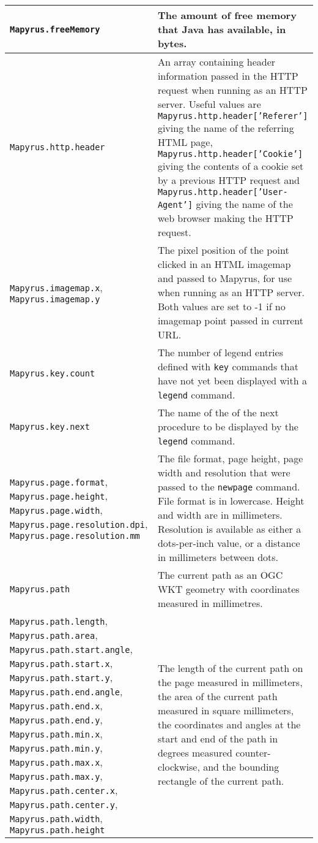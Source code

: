 \begin{longtable}{|p{6cm}|p{7cm}|}
\texttt{Mapyrus.freeMemory} &
The amount of free memory that Java has available, in bytes. \\

\hline

\texttt{Mapyrus.http.header} &
An array containing header information passed in the HTTP request
when running as an HTTP server.
Useful values are
\texttt{Mapyrus.http.header['Referer']}
giving the name of the referring HTML page,
\texttt{Mapyrus.http.header['Cookie']}
giving the contents of a cookie set by a previous HTTP request and
\texttt{Mapyrus.http.header['User-Agent']}
giving the name of the web browser making the HTTP request.  \\

\hline

\texttt{Mapyrus.imagemap.x},
\texttt{Mapyrus.imagemap.y} &
The pixel position of the point clicked in an HTML imagemap and
passed to Mapyrus, for use when running as an HTTP server.
Both values are set to -1 if no imagemap point passed in current URL. \\

\hline

\texttt{Mapyrus.key.count} &
The number of legend entries defined with
\texttt{key} commands that have not yet
been displayed with a
\texttt{legend} command. \\

\hline

\texttt{Mapyrus.key.next} &
The name of the of the next procedure to be displayed by the
\texttt{legend} command. \\

\hline

\texttt{Mapyrus.page.format},
\texttt{Mapyrus.page.height},
\texttt{Mapyrus.page.width},
\texttt{Mapyrus.page.resolution.dpi},
\texttt{Mapyrus.page.resolution.mm} &
The file format, page height, page width
and resolution that were passed to the
\texttt{newpage} command.  File format is in lowercase.
Height and width are in millimeters.  Resolution is available
as either a dots-per-inch value, or a distance in millimeters between
dots. \\

\hline
\texttt{Mapyrus.path} &
The current path as an OGC WKT geometry with coordinates measured
in millimetres. \\

\hline

\texttt{Mapyrus.path.length},
\texttt{Mapyrus.path.area},
\texttt{Mapyrus.path.start.angle},
\texttt{Mapyrus.path.start.x},
\texttt{Mapyrus.path.start.y},
\texttt{Mapyrus.path.end.angle},
\texttt{Mapyrus.path.end.x},
\texttt{Mapyrus.path.end.y},
\texttt{Mapyrus.path.min.x},
\texttt{Mapyrus.path.min.y},
\texttt{Mapyrus.path.max.x},
\texttt{Mapyrus.path.max.y},
\texttt{Mapyrus.path.center.x},
\texttt{Mapyrus.path.center.y},
\texttt{Mapyrus.path.width},
\texttt{Mapyrus.path.height} &
The length of the current path on the page measured in millimeters,
the area of the current path measured in square millimeters,
the coordinates and angles at the start and end of the path in degrees measured
counter-clockwise,
and the bounding rectangle of the current path.  \\


\end{longtable}
